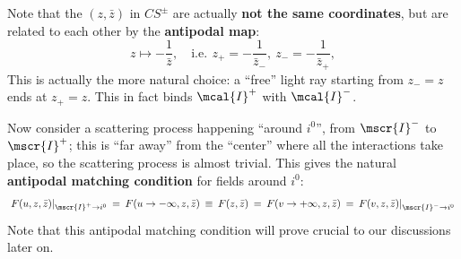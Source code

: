 \documentclass[a4paper
	,10pt
]{article}
\begin{document}
\pagebreak[4]
	Note that the $(z,\bar{z})$ in $CS^\pm$ are actually \textbf{not the same coordinates}, but are related to each other by the \textbf{antipodal map}:
	\begin{equation}
		z \mapsto -\frac{1}{\bar{z}},
	\quad
		\text{i.e.}\,\ %
		z_+ = - \frac{1}{\bar{z}_-},
	\ %
		z_- = - \frac{1}{\bar{z}_+},
	\end{equation}
	This is actually the more natural choice: a ``free'' light ray starting from $z_- = z$ ends at $z_+ = z$. This in fact binds $\mcal{I}^+$ with $\mcal{I}^-$. 
	
	Now consider a scattering process happening ``around $i^0$'', from $\mscr{I}^-$ to $\mscr{I}^+$; this is ``far away'' from the ``center'' where all the interactions take place, so the scattering process is almost trivial. 
	This gives the natural \textbf{antipodal matching condition} for fields around $i^0$:
	\begin{equation}
	\arraycolsep=.25em
	\begin{array}{ccccccccc}
		F(u,z,\bar{z})|_{\mscr{I}^+\to i^0}
		&=& F(u\to -\infty,z,\bar{z})
		&\equiv& F(z,\bar{z})
		&=& F(v\to +\infty,z,\bar{z})
		&=& F(v,z,\bar{z})|_{\mscr{I}^-\to i^0}
	\end{array}
	\end{equation}
	Note that this antipodal matching condition will prove crucial to our discussions later on. 
\end{document}
